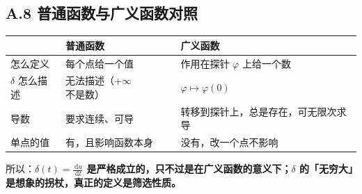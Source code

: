 \documentclass[UTF8,a4paper,11pt]{ctexart}
\renewcommand{\d}{\,\mathrm{d}}
\newcounter{ex}[section]
\begin{document}
\subsection*{A.8 普通函数与广义函数对照}
\begin{center}
\begin{tabular}{p{}p{}p{}}
\toprule
 & 普通函数 & 广义函数 \\
\midrule
怎么定义 & 每个点给一个值 & 作用在探针 $\varphi$ 上给一个数 \\
$\delta$ 怎么描述 & 无法描述（$+\infty$ 不是数） & $\varphi\mapsto\varphi(0)$ \\
导数 & 要求连续、可导 & 转移到探针上，总是存在，可无限次求导 \\
单点的值 & 有，且影响函数本身 & 没有，改一个点不影响 \\
\bottomrule
\end{tabular}
\end{center}
所以：\textbf{$\delta(t)=\frac{\d u}{\d t}$ 是严格成立的，只不过是在广义函数的意义下；$\delta$ 的「无穷大」是想象的拐杖，真正的定义是筛选性质。}
\end{document}
